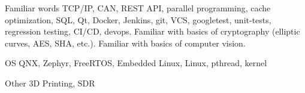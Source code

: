 


\begin{cvskills}


\cvskill
{Familiar words} %
{TCP/IP, CAN, REST API, parallel programming, cache optimization, SQL, Qt, Docker, Jenkins, git, VCS, googletest,
unit-tests, regression testing, CI/CD, devops. 
Familiar with basics of cryptography (elliptic curves, AES, SHA, etc.). Familiar with basics of computer vision.} %


\cvskill
{OS} %
{QNX, Zephyr, FreeRTOS, Embedded Linux, Linux, pthread, kernel} %


\cvskill
{Other} %
{3D Printing, SDR} %


\end{cvskills}